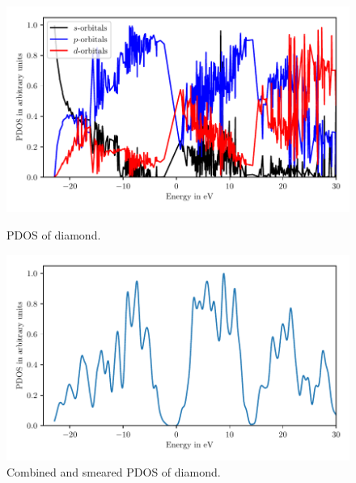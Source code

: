 \documentclass[a4paper,10pt,bibtotoc]{scrartcl}
\begin{document}
\begin{figure}[h]
\centering
 \includegraphics[width=\textwidth]{Figure_PDOS.pdf}
 \caption{PDOS of diamond.}
 \label{fig:fig4}
 \includegraphics[width=\textwidth]{Figure_smeared_PDOS.pdf}
 \caption{Combined and smeared PDOS of diamond.}
 \label{fig:fig5}
\end{figure}
\end{document}
